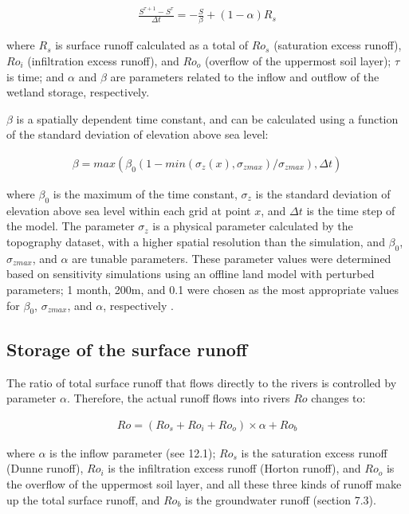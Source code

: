\begin{eqnarray}
\frac{S^{\tau +1}-S^{\tau }}{\Delta t}=-\frac{S}{\beta}+(1-\alpha )R_{s}
\end{eqnarray}

where \(R_{s}\) is surface runoff calculated as a total of \(Ro_{s}\) (saturation excess runoff), \(Ro_{i}\) (infiltration excess runoff), and \(Ro_{o}\) (overflow of the uppermost soil layer);
\(\tau\) is time; and \(\alpha\) and \(\beta\) are parameters related to the inflow and outflow of the wetland storage, respectively.

\(\beta\) is a spatially dependent time constant, and can be calculated using a function of the standard deviation of elevation above sea level:

\begin{eqnarray}
\beta =max(\beta_{0}(1-min(\sigma_{z}(x),\sigma_{z max})/\sigma_{z max}), \Delta t)
\end{eqnarray}

where \(\beta_{0}\) is the maximum of the time constant, \(\sigma_{z}\) is the standard deviation of elevation above sea level within each grid at point \(x\), and \(\Delta t\) is the time step of the
model. The parameter \(\sigma_{z}\) is a physical parameter calculated by the topography dataset, with a higher spatial resolution than the simulation, and \(\beta_{0}\), \(\sigma_{zmax}\), and
\(\alpha\) are tunable parameters. These parameter values were determined based on sensitivity simulations using an offline land model with perturbed parameters; 1 month, 200m, and 0.1 were chosen as
the most appropriate values for \(\beta_{0}\), \(\sigma _{zmax}\), and \(\alpha\), respectively \citep{Nitta2015-ob}.

\subsection{Storage of the surface runoff}\label{storage-of-the-surface-runoff}

The ratio of total surface runoff that flows directly to the rivers is controlled by parameter \(\alpha\). Therefore, the actual runoff flows into rivers \(Ro\) changes to:

\begin{eqnarray}
Ro=(Ro_{s}+Ro_{i}+Ro_{o})\times \alpha + Ro_{b}
\end{eqnarray}

where \(\alpha\) is the inflow parameter (see 12.1); \(Ro_{s}\) is the saturation excess runoff (Dunne runoff), \(Ro_{i}\) is the infiltration excess runoff (Horton runoff), and \(Ro_{o}\) is the
overflow of the uppermost soil layer, and all these three kinds of runoff make up the total surface runoff, and \(Ro_{b}\) is the groundwater runoff (section 7.3).

